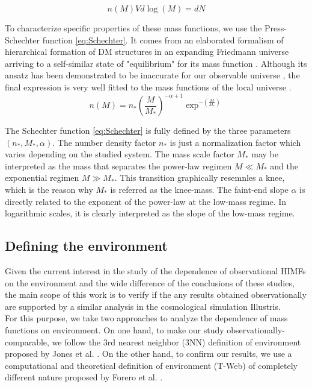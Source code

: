 \documentclass[a4paper,fleqn,usenatbib]{mnras}
\begin{document}
\begin{equation}
n(M)Vd\log{(M)} =  dN
\end{equation}

To characterize specific properties of these mass functions, we use the Press-Schechter function \ref{eq:Schechter}. 
It comes from an elaborated formalism of hierarchical formation of DM structures in an expanding Friedmann universe arriving to a self-similar state of "equilibrium" for its mass function \cite{Schechter1976}.
Although its ansatz has been demonstrated to be inaccurate for our observable universe \cite{inaccurateSchechter}, the final expression is very well fitted to the mass functions of the local universe \cite{wellfitSchechter}.\\

\begin{equation}
n\left( M \right) = n_*\left( \frac{M}{M_*} \right)^{-\alpha+1}\exp^{-\left( \frac{M}{M_*}\right)}
\label{eq:Schechter}
\end{equation}

The Schechter function \ref{eq:Schechter} is fully defined by the three parameters $(n_*,M_*,\alpha)$. 
The number density factor $n_*$ is just a normalization factor which varies depending on the studied system. 
The mass scale factor $M_*$ may be interpreted as the mass that separates the power-law regimen $M \ll M_*$ and the exponential regimen $M \gg M_*$. 
This transition graphically resemnles a knee, which is the reason why $M_*$ is referred as the knee-mass.
The faint-end slope $\alpha$ is directly related to the exponent of the power-law at the low-mass regime.
In logarithmic scales, it is clearly interpreted as the slope of the low-mass regime.\\

\subsection{Defining the environment}

Given the current interest in the study of the dependence of observational HIMFs on the environment and the wide difference of the conclusions of these studies, the main scope of this work is to verify if the any results obtained observationally are supported by a similar analysis in the cosmological simulation Illustris.\\

For this purpose, we take two approaches to analyze the dependence of mass functions on environment. 
On one hand, to make our study observationally-comparable, we follow the 3rd nearest neighbor (3NN) definition of environment proposed by Jones et al. \cite{Jones2016}. 
On the other hand, to confirm our results, we use a computational and theoretical definition of environment (T-Web) of completely different nature proposed by Forero et al. \cite{Forero2009}. 
\end{document}
